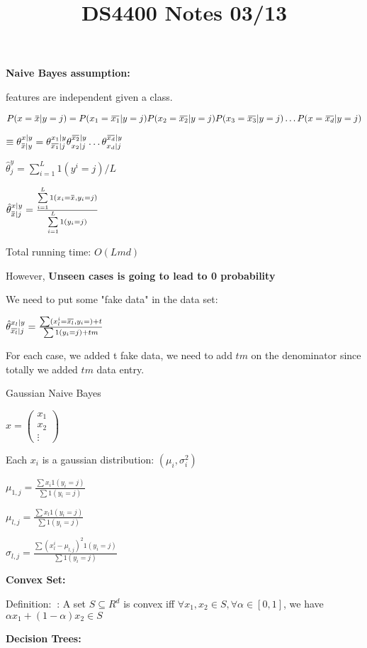 \documentclass[12pt]{article}
\newcommand{\defi}{{\color{blue} Definition: $\ $}}
\newcommand{\overbar}[1]{\mkern 1.5mu\overline{\mkern-1.5mu#1\mkern-1.5mu}\mkern 1.5mu}
\begin{document}
        \textbf{Naive Bayes assumption:}

        features are independent given a class.

        $P(x = \overbar{x} | y = j) = P(x_1 = \overbar{x_1}|y = j)P(x_2 = \overbar{x_2}|y = j)P(x_3 = \overbar{x_3}|y = j) \dots P(x = \overbar{x_d}|y = j)$

        $\equiv  \theta^{x | y}_{\overbar{x} | y} = \theta^{x_1 | y}_{\overbar{x_1} | j}\theta^{\overbar{x_2} | y}_{x_2 | j} \dots \theta^{\overbar{x_d} | y}_{x_d | j}$

        $\hat{\theta}_j^y = \sum_{i=1}^{L}1(y^i=j)/L$

        $\hat{\theta}_{\overbar{x}|j}^{x|y} = \frac{\sum\limits_{i = 1}^L1(x_i = \overbar{x}, y_i = j)}{\sum\limits_{i = 1}^{L}1(y_i = j)}$

        Total running time: $O(Lmd)$

        However, \textbf{Unseen cases is going to lead to 0 probability}

        We need to put some "fake data" in the data set:

        $\hat{\theta}^{x_l|y}_{\overbar{x_l}|j} = \frac{\sum(x_l^i= \overbar{x_l}, y_i = ) + t}{\sum 1(y_i = j) + tm}$

        For each case, we added t fake data, we need to add $tm$ on the denominator since totally we added $tm$ data entry.

        Gaussian Naive Bayes

        $x = \begin{pmatrix}
            x_1 \\ x_2 \\ \vdots
        \end{pmatrix}$

        Each $x_i$ is a gaussian distribution: $(\mu_i, \sigma_i^2)$

        $\mu_{1,j} = \frac{\sum x_i 1(y_i = j)}{\sum 1(y_i = j)}$

        $\mu_{l,j} = \frac{\sum x_l 1(y_i = j)}{\sum 1(y_i = j)}$

        $\sigma_{l,j} = \frac{\sum (x_l^i - \mu_{l,j})^2 1(y_i = j)}{\sum 1(y_i = j)}$
        
        \textbf{Convex Set:} 
        
        \defi: A set $S \subseteq R^d$ is convex iff $\forall x_1, x_2 \in S, \forall \alpha \in [0,1]$, we have $\alpha x_1 + (1-\alpha)x_2 \in S$ 
        

        \title{DS4400 Notes 03/13}
        \maketitle

        \textbf{Decision Trees:}
        

    
\end{document}
